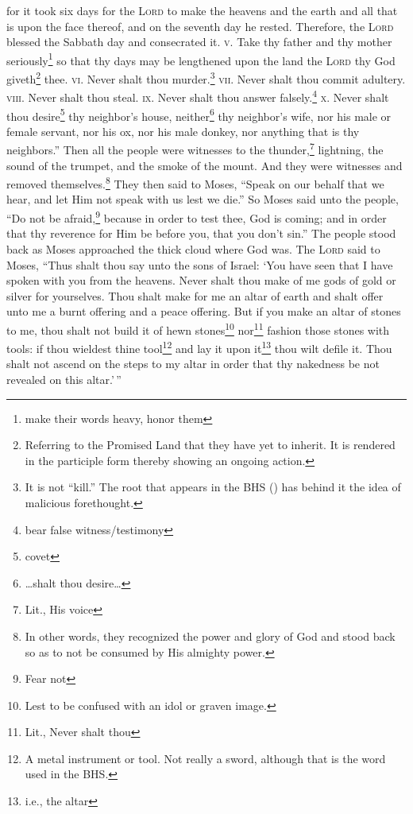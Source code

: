 \begin{enumerate}[align=center]
     for it took six days for the \textsc{Lord} to make the heavens and the earth and all that is upon the face thereof, and on the seventh day he rested. Therefore, the \textsc{Lord} blessed the Sabbath day and consecrated it.%
     \textsc{v.} Take thy father and thy mother seriously\footnote{make their words heavy, honor them} so that thy days may be lengthened upon the land the \textsc{Lord} thy God giveth\footnote{Referring to the Promised Land that they have yet to inherit. It is rendered in the participle form thereby showing an ongoing action.} thee.%
     \textsc{vi.} Never shalt thou murder.\footnote{It is not ``kill.'' The root that appears in the BHS () has behind it the idea of malicious forethought.}%
     \textsc{vii.} Never shalt thou commit adultery.%
     \textsc{viii.} Never shalt thou steal.%
     \textsc{ix.} Never shalt thou answer falsely.\footnote{bear false witness/testimony}%
     \textsc{x.} Never shalt thou desire\footnote{covet} thy neighbor's house, neither\footnote{\dots shalt thou desire\dots} thy neighbor's wife, nor his male or female servant, nor his ox, nor his male donkey, nor anything that is thy neighbors.''%
     Then all the people were witnesses to the thunder,\footnote{Lit., His voice} lightning, the sound of the trumpet, and the smoke of the mount. And they were witnesses and removed themselves.\footnote{In other words, they recognized the power and glory of God and stood back so as to not be consumed by His almighty power.}%
     They then said to Moses, ``Speak on our behalf that we hear, and let Him not speak with us lest we die.''%
     So Moses said unto the people, ``Do not be afraid,\footnote{Fear not} because in order to test thee, God is coming; and in order that thy reverence for Him be before you, that you don't sin.''%
     The people stood back as Moses approached the thick cloud where God was.%
     The \textsc{Lord} said to Moses, ``Thus shalt thou say unto the sons of Israel: `You have seen that I have spoken with you from the heavens.%
     Never shalt thou make of me gods of gold or silver for yourselves.%
     Thou shalt make for me an altar of earth and shalt offer unto me a burnt offering and a peace offering.%
     But if you make an altar of stones to me, thou shalt not build it of hewn stones\footnote{Lest to be confused with an idol or graven image.} nor\footnote{Lit., Never shalt thou} fashion those stones with tools: if thou wieldest thine tool\footnote{A metal instrument or tool. Not really a sword, although that is the word used in the BHS.} and lay it upon it\footnote{i.e., the altar} thou wilt defile it.%
     Thou shalt not ascend on the steps to my altar in order that thy nakedness be not revealed on this altar.'\,''%
\end{enumerate}
